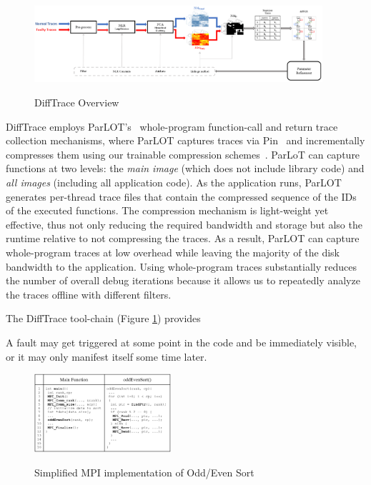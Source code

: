 \begin{figure}[]
\caption{DiffTrace Overview}
\includegraphics[width=0.95\textwidth]{figs/overview.png}
\label{fig.diffTraceOverview}
\end{figure}

DiffTrace employs
ParLOT's~\cite{parlot} whole-program function-call and return trace collection
mechanisms, where ParLOT captures traces
via Pin~\cite{pin} and incrementally compresses them using our trainable
compression schemes~\cite{martin-compression-paper}.
%
ParLoT can capture functions at two levels:
the \textit{main image} (which does not include library code)
and \textit{all images} (including all application code).
%
As the application runs,
ParLOT generates per-thread trace files that
contain the compressed sequence of the IDs of the executed functions.
%
The compression mechanism is light-weight yet effective,
thus not only reducing the required bandwidth and storage but also the
runtime relative to not compressing the traces.
As a result, ParLOT can capture whole-program traces at low overhead
while leaving the majority of the disk bandwidth to the application. 
%
Using whole-program traces substantially reduces the number of overall
debug iterations because it allows us to repeatedly analyze the
traces offline with different filters.


The DiffTrace tool-chain (Figure \ref{fig.diffTraceOverview}) provides

A fault may get triggered at some point in the code and be immediately visible, or it may only manifest itself some time later.



\begin{figure}[]
\centering
\caption{Simplified MPI implementation of Odd/Even Sort}
\includegraphics[width=0.45\textwidth]{figs/oddEven.png}
\label{fig.oddEven}
\end{figure}

